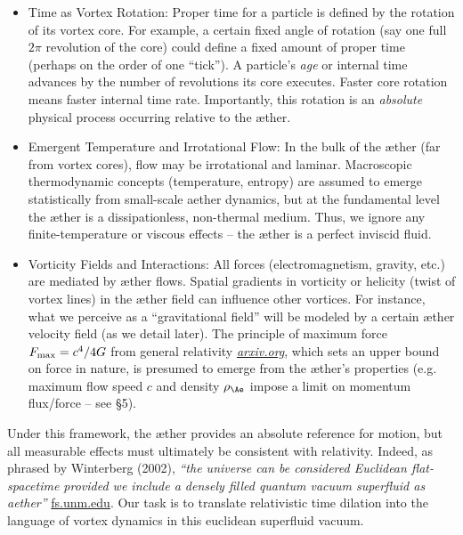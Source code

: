 \documentclass[aps,preprint,superscriptaddress]{revtex4}
\begin{document}
\begin{itemize}
        \item
        Time as Vortex Rotation: Proper time for a particle is defined by the rotation of its vortex core. For example, a certain fixed angle of rotation (say one full $2\pi$ revolution of the core) could define a fixed amount of proper time (perhaps on the order of one “tick”). A particle’s \textit{age} or internal time advances by the number of revolutions its core executes. Faster core rotation means faster internal time rate. Importantly, this rotation is an \textit{absolute} physical process occurring relative to the æther.

        \item
        Emergent Temperature and Irrotational Flow: In the bulk of the æther (far from vortex cores), flow may be irrotational and laminar. Macroscopic thermodynamic concepts (temperature, entropy) are assumed to emerge statistically from small-scale aether dynamics, but at the fundamental level the æther is a dissipationless, non-thermal medium. Thus, we ignore any finite-temperature or viscous effects – the æther is a perfect inviscid fluid.

        \item
        Vorticity Fields and Interactions: All forces (electromagnetism, gravity, etc.) are mediated by æther flows. Spatial gradients in vorticity or helicity (twist of vortex lines) in the æther field can influence other vortices. For instance, what we perceive as a “gravitational field” will be modeled by a certain æther velocity field (as we detail later). The principle of maximum force $F_{\rm max}=c^4/4G$ from general relativity
        \href{https://arxiv.org/abs/2205.06302#:~:text=the%20principle%20of%20maximum%20force,The%20limits%20illuminate}{\textit{arxiv.org}}, which sets an upper bound on force in nature, is presumed to emerge from the æther’s properties (e.g. maximum flow speed $c$ and density $\rho_{\Ae}$ impose a limit on momentum flux/force – see §5).
    \end{itemize}

    Under this framework, the æther provides an absolute reference for motion, but all measurable effects must ultimately be consistent with relativity. Indeed, as phrased by Winterberg (2002), \textit{“the universe can be considered Euclidean flat-spacetime provided we include a densely filled quantum vacuum superfluid as aether”}
    \href{https://fs.unm.edu/QuantizationDiscretization.pdf#:~:text=Winterberg%20,an%20equal%20number%20of%20positive}{fs.unm.edu}. Our task is to translate relativistic time dilation into the language of vortex dynamics in this euclidean superfluid vacuum.
\end{document}
